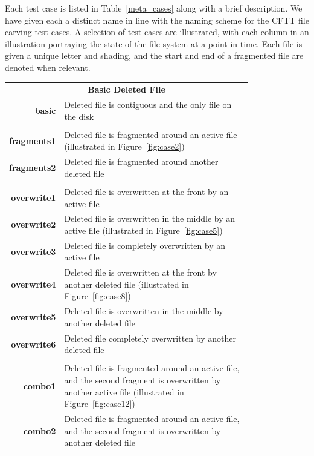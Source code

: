 Each test case is listed in Table~\ref{meta_cases} along with a brief description.
We have given each a distinct name in line with the naming scheme for the CFTT file carving test cases.
A selection of test cases are illustrated, with each column in an illustration portraying the state of the file system at a point in time. 
Each file is given a unique letter and shading, and the start and end of a fragmented file are denoted when relevant.

\begin{table}[ht!]
{\begin{tabular*}{\textwidth}{@{}rp{0.8\linewidth}@{}} \toprule
\multicolumn{2}{c}{\textbf{Basic Deleted File}} \\ \colrule
\textbf{basic} & Deleted file is contiguous and the only file on the disk \\
\colrule
\multicolumn{2}{c}{\textbf{Deleted File is Fragmented}} \\ \colrule
\textbf{fragments1} & Deleted file is fragmented around an active file (illustrated in Figure~\ref{fig:case2}) \\
\textbf{fragments2} & Deleted file is fragmented around another deleted file \\
\colrule
\multicolumn{2}{c}{\textbf{Deleted File is Overwritten}} \\ \colrule
\textbf{overwrite1} & Deleted file is overwritten at the front by an active file \\
\textbf{overwrite2} & Deleted file is overwritten in the middle by an active file (illustrated in Figure~\ref{fig:case5}) \\
\textbf{overwrite3} & Deleted file is completely overwritten by an active file \\
\textbf{overwrite4} & Deleted file is overwritten at the front by another deleted file (illustrated in Figure~\ref{fig:case8}) \\
\textbf{overwrite5} & Deleted file is overwritten in the middle by another deleted file \\
\textbf{overwrite6} & Deleted file completely overwritten by another deleted file \\
\colrule
\multicolumn{2}{c}{\textbf{Deleted File is Fragmented and Overwritten}} \\ \colrule
\textbf{combo1} & Deleted file is fragmented around an active file, and the second fragment is overwritten by another active file (illustrated in Figure~\ref{fig:case12}) \\
\textbf{combo2} & Deleted file is fragmented around an active file, and the second fragment is overwritten by another deleted file \\

\end{tabular*}}
\end{table}
